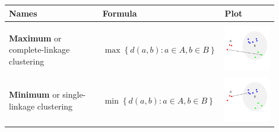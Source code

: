 \documentclass[11pt]{article}
\theoremstyle{definition}
\begin{document}
\begin{tabularx}{\linewidth}{m{0.35\linewidth} m{0.35\linewidth} m{0.2\linewidth}}
	\textbf{Names} & \textbf{Formula} & \textbf{Plot}\\
	\hline
	&&\\[-0.5em]
	\textbf{Maximum} or complete-linkage clustering & $ \max\left\{ d(a,b):a\in A, b\in B \right\} $ & \includegraphics[width=\linewidth]{complete_linkage}\\
	\textbf{Minimum} or single-linkage clustering & $ \min\left\{ d(a,b):a\in A, b\in B \right\} $ & \includegraphics[width=\linewidth]{single_linkage}\\

\end{tabularx}
\end{document}
